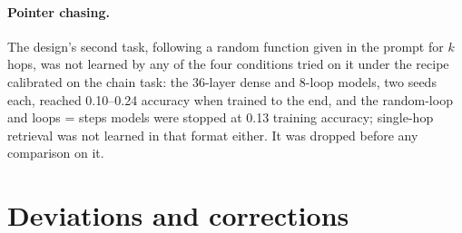 \paragraph{Pointer chasing.} The design's second task, following a random function given in the prompt for $k$ hops,
was not learned by any of the four conditions tried on it under the recipe calibrated on the chain task: the 36-layer
dense and 8-loop models, two seeds each, reached 0.10--0.24 accuracy when trained to the end, and the random-loop and
loops = steps models were stopped at 0.13 training accuracy; single-hop retrieval was not learned in that format either.
It was dropped before any comparison on it.

\section{Deviations and corrections}
\label{app:deviations}

